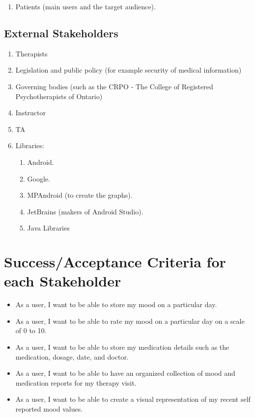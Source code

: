 \documentclass[11pt]{article}
\begin{document}
    \begin{enumerate}
        \item Patients (main users and the target audience).
    \end{enumerate}

    \subsection{External Stakeholders}\label{subsec:external-stakeholders}

    \begin{enumerate}
        \item Therapists
        \item Legislation and public policy (for example security of medical information)
        \item Governing bodies (such as the CRPO - The College of Registered Psychotherapists of Ontario)
        \item Instructor
        \item TA
        \item Libraries:
        \begin{enumerate}
            \item Android.
            \item Google.
            \item MPAndroid (to create the graphs).
            \item JetBrains (makers of Android Studio).
            \item Java Libraries
        \end{enumerate}
    \end{enumerate}


    \section{Success/Acceptance Criteria for each Stakeholder}\label{sec:success/acceptance-criteria-for-each-stakeholder}

    \begin{itemize}
        \item As a user, I want to be able to store my mood on a particular day.
        \item As a user, I want to be able to rate my mood on a particular day on a scale of 0 to 10.
        \item As a user, I want to be able to store my medication details such as the medication, dosage, date, and doctor.
        \item As a user, I want to be able to have an organized collection of mood and medication reports for my therapy visit.
        \item As a user, I want to be able to create a visual representation of my recent self reported mood values.
    \end{itemize}
\end{document}

